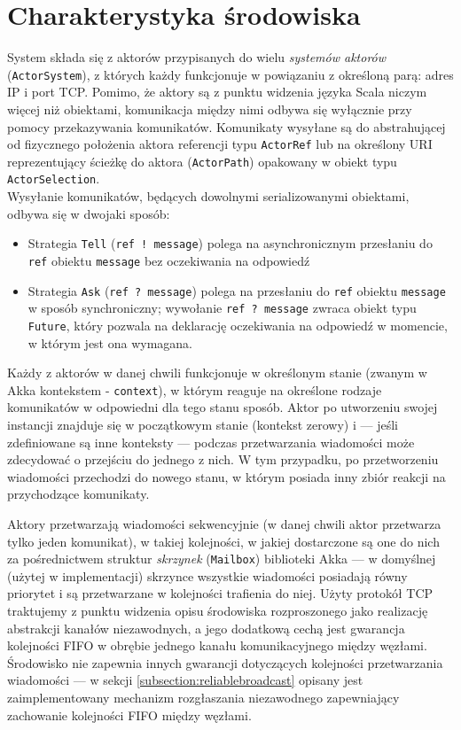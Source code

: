 \section{Charakterystyka środowiska} \label{section:remarks}

System składa się z aktorów przypisanych do wielu \textit{systemów aktorów} (\texttt{ActorSystem}), z których każdy funkcjonuje w powiązaniu z określoną parą: adres IP i port TCP. Pomimo, że aktory są z punktu widzenia języka Scala niczym więcej niż obiektami, komunikacja między nimi odbywa się wyłącznie przy pomocy przekazywania komunikatów. Komunikaty wysyłane są do abstrahującej od fizycznego położenia aktora referencji typu \texttt{ActorRef} lub na określony URI reprezentujący ścieżkę do aktora (\texttt{ActorPath}) opakowany w obiekt typu \texttt{ActorSelection}. \\
Wysyłanie komunikatów, będących dowolnymi serializowanymi obiektami, odbywa się w dwojaki sposób:
\begin{itemize}
    \item Strategia \texttt{Tell} (\texttt{ref ! message}) polega na asynchronicznym przesłaniu do \texttt{ref} obiektu \texttt{message} bez oczekiwania na odpowiedź
    \item Strategia \texttt{Ask} (\texttt{ref ? message}) polega na przesłaniu do \texttt{ref} obiektu \texttt{message} w sposób synchroniczny; wywołanie \texttt{ref ? message} zwraca obiekt typu \texttt{Future}, który pozwala na deklarację oczekiwania na odpowiedź w momencie, w którym jest ona wymagana.
\end{itemize}

Każdy z aktorów w danej chwili funkcjonuje w określonym stanie (zwanym w Akka kontekstem - \texttt{context}), w którym reaguje na określone rodzaje komunikatów w odpowiedni dla tego stanu sposób. Aktor po utworzeniu swojej instancji znajduje się w początkowym stanie (kontekst zerowy) i --- jeśli zdefiniowane są inne konteksty --- podczas przetwarzania wiadomości może zdecydować o przejściu do jednego z nich. W tym przypadku, po przetworzeniu wiadomości przechodzi do nowego stanu, w którym posiada inny zbiór reakcji na przychodzące komunikaty.

Aktory przetwarzają wiadomości sekwencyjnie (w danej chwili aktor przetwarza tylko jeden komunikat), w takiej kolejności, w jakiej dostarczone są one do nich za pośrednictwem struktur \textit{skrzynek} (\texttt{Mailbox}) biblioteki Akka --- w domyślnej (użytej w implementacji) skrzynce wszystkie wiadomości posiadają równy priorytet i są przetwarzane w kolejności trafienia do niej. Użyty protokół TCP traktujemy z punktu widzenia opisu środowiska rozproszonego jako realizację abstrakcji kanałów niezawodnych, a jego dodatkową cechą jest gwarancja kolejności FIFO w obrębie jednego kanału komunikacyjnego między węzłami. Środowisko nie zapewnia innych gwarancji dotyczących kolejności przetwarzania wiadomości --- w sekcji \ref{subsection:reliablebroadcast} opisany jest zaimplementowany mechanizm rozgłaszania niezawodnego zapewniający zachowanie kolejności FIFO między węzłami.

